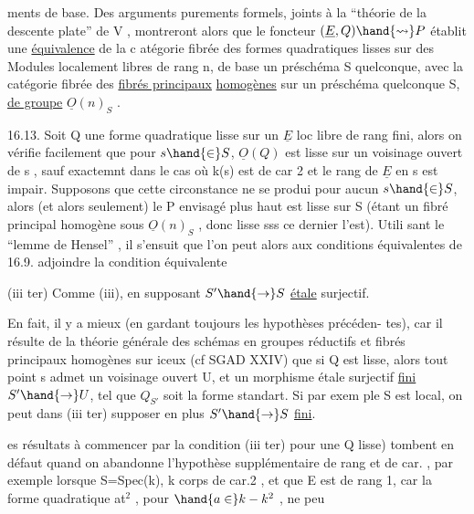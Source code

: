 
ments de base. Des arguments purements formels, joints à la
``théorie de la descente plate'' de  V  , montreront alors que le foncteur
$(\underline{E},Q) \hand{\rightsquigarrow} P$ établit une \uline{équivalence} de la c atégorie fibrée des formes
quadratiques lisses sur des Modules localement libres de rang n, de base
un préschéma S quelconque, avec la catégorie fibrée des \uline{fibrés principaux}
\uline{homogènes} sur un préschéma quelconque S, \uline{de groupe} $\underline{O}(n)_S$ .

16.13. Soit Q une forme quadratique lisse sur un $\underline{E}$ loc libre de
rang fini, alors on vérifie facilement que pour $s \hand{\in} S$, $\underline{O}(Q)$ est lisse
sur un voisinage ouvert de s ,  sauf exactemnt dans
le cas où k(s) est de car 2 et le rang de $\underline{E}$ en s est impair. Supposons
que cette circonstance ne se produi pour aucun $s \hand{\in} S$, alors (et alors
seulement) le P envisagé plus haut est lisse sur S (étant un fibré
principal homogène sous $\underline{O}(n)_S$ , donc lisse sss ce dernier l'est). Utili
sant le ``lemme de Hensel'' , il s'ensuit que  l'on peut alors aux
conditions équivalentes de 16.9. adjoindre la condition  équivalente

(iii ter)  Comme (iii), en supposant $S' \hand{\to} S$
\uline{étale} surjectif.

En fait, il y a mieux (en gardant toujours les hypothèses précéden-%
tes), car il résulte de la théorie générale des schémas en groupes réductifs
et fibrés principaux homogènes sur iceux (cf SGAD XXIV) que  si Q est
lisse, alors tout point s admet un voisinage ouvert U, et un morphisme
étale surjectif \uline{fini} $S' \hand{\to} U$, tel que $Q_{S'}$ soit la forme standart. Si par exem
ple S est local, on peut dans (iii ter) supposer en plus $S' \hand{\to} S$ \uline{fini}.

 \hand{(}es résultats  \hand{(}à commencer par la condition (iii ter) pour une Q
lisse)\hand{)} tombent en défaut quand on abandonne l'hypothèse supplémentaire
de rang et de car. , par exemple lorsque S=Spec(k), k corps  de car.2 , et
que E est de rang 1, car la forme quadratique at$^{2}$ , pour $\hand{a \in} k - k^{2}$ , ne peu

